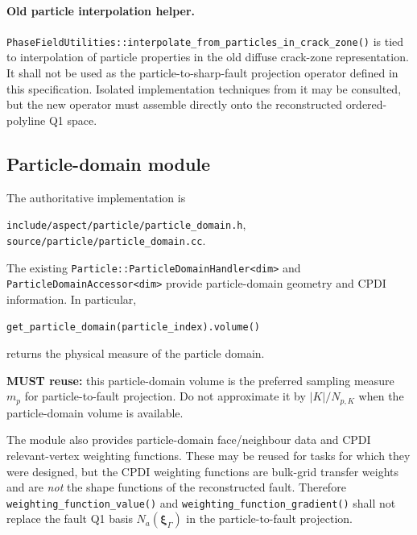 \documentclass[11pt]{article}
\begin{document}
\paragraph{Old particle interpolation helper.}
\texttt{PhaseFieldUtilities::interpolate\_from\_particles\_in\_crack\_zone()} is tied to interpolation of particle properties in the old diffuse crack-zone representation.  It shall not be used as the particle-to-sharp-fault projection operator defined in this specification.  Isolated implementation techniques from it may be consulted, but the new operator must assemble directly onto the reconstructed ordered-polyline Q1 space.

\subsection{Particle-domain module}
The authoritative implementation is
\begin{center}
\texttt{include/aspect/particle/particle\_domain.h},\qquad
\texttt{source/particle/particle\_domain.cc}.
\end{center}
The existing \texttt{Particle::ParticleDomainHandler<dim>} and \texttt{ParticleDomainAccessor<dim>} provide particle-domain geometry and CPDI information.  In particular,
\begin{center}
\texttt{get\_particle\_domain(particle\_index).volume()}
\end{center}
returns the physical measure of the particle domain.

\textbf{MUST reuse:} this particle-domain volume is the preferred sampling measure $m_p$ for particle-to-fault projection.  Do not approximate it by $|K|/N_{p,K}$ when the particle-domain volume is available.

The module also provides particle-domain face/neighbour data and CPDI relevant-vertex weighting functions.  These may be reused for tasks for which they were designed, but the CPDI weighting functions are bulk-grid transfer weights and are \emph{not} the shape functions of the reconstructed fault.  Therefore \texttt{weighting\_function\_value()} and \texttt{weighting\_function\_gradient()} shall not replace the fault Q1 basis $N_a(\boldsymbol\xi_\Gamma)$ in the particle-to-fault projection.
\end{document}
